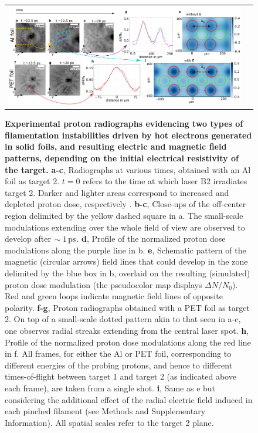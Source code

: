 \documentclass[aps,twocolumn,showpacs,superscriptaddress]{revtex4}
\begin{document}
\begin{figure}[tbh!]
\begin{tabular}{cc}
\includegraphics[scale = 0.6]{panel_v7_woE.png}
\end{tabular}
 \caption{
\textbf{Experimental proton radiographs evidencing two types of filamentation instabilities driven by hot electrons generated in solid foils, and resulting electric and magnetic field patterns, depending on the initial electrical resistivity of the target.}
\textbf{a-c}, Radiographs at various times, obtained with an Al foil as target 2. $t=0$ refers to the time at which laser B2 irradiates target 2. Darker and lighter areas correspond to increased and depleted proton dose, respectively \cite{RSI_Albertazzi_2015}. 
\textbf{b-c}, Close-ups of the off-center region delimited by the yellow dashed square in a. The small-scale modulations extending over the whole field of view are observed to develop after $\sim 1\,\rm ps$.
\textbf{d}, Profile  of the normalized proton dose modulations along the purple line in b.
\textbf{e}, Schematic pattern of the magnetic (circular arrows) field lines that could develop in the zone delimited by the blue box in b, overlaid on the resulting (simulated) proton dose modulation (the pseudocolor map displays $\Delta N/N_0$). Red and green loops indicate magnetic field lines of opposite polarity.
\textbf{f-g}, Proton radiographs obtained with a PET foil as target 2. 
On top of a small-scale dotted pattern akin to that seen in a-c, one observes radial streaks extending from the central laser spot. 
\textbf{h}, Profile of the normalized proton dose modulations along the red line in f.
All frames, for either the Al or PET foil, corresponding to different energies of the probing protons, and hence to different times-of-flight between target 1 and target 2 (as indicated above each frame), are taken from a single shot.
\textbf{i}, Same as e but considering the additional effect of the radial electric field induced in each pinched filament (see Methods and  Supplementary Information).
All spatial scales refer to the target 2 plane.}
\label{fig:radio}
\end{figure}
\end{document}
